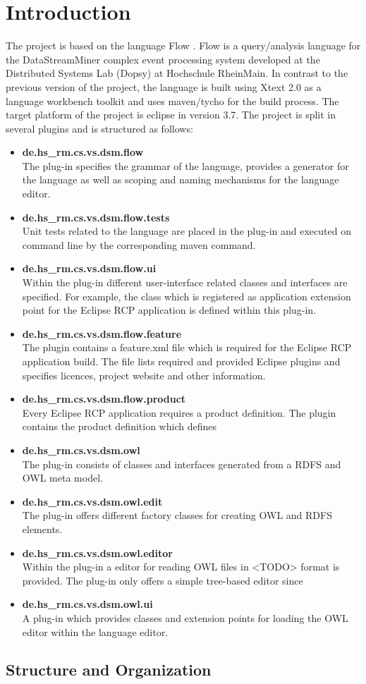 \section{Introduction}
The project is based on the language Flow \cite{297:Frey2010}. Flow is a 
query/analysis language for the DataStreamMiner complex event processing system 
developed at the Distributed Systems Lab (Dopsy) at Hochschule RheinMain. In contrast to 
the previous version of the project, the language is built using Xtext 2.0 as a
language workbench toolkit and uses maven/tycho for the build process. The 
target platform of the project is eclipse in version 3.7. The project is split 
in several plugins and is structured as follows:
\begin{itemize}
  \item \textbf{de.hs\_rm.cs.vs.dsm.flow} \\
  The plug-in specifies the grammar of the language, provides a generator for 
  the language as well as scoping and naming mechanisms for the language editor.
  \item \textbf{ de.hs\_rm.cs.vs.dsm.flow.tests} \\
  Unit tests related to the language are placed in the plug-in and executed on 
  command line by the corresponding maven command.
  \item \textbf{de.hs\_rm.cs.vs.dsm.flow.ui} \\
  Within the plug-in different user-interface related classes and interfaces are
  specified. For example, the class which is registered as application extension 
  point for the Eclipse RCP application is defined within this plug-in.
  \item \textbf{de.hs\_rm.cs.vs.dsm.flow.feature} \\
  The plugin contains a feature.xml file which is required for the Eclipse RCP 
  application build. The file lists required and provided Eclipse plugins and 
  specifies licences, project website and other information.
  \item \textbf{de.hs\_rm.cs.vs.dsm.flow.product} \\
  Every Eclipse RCP application requires a product definition. The plugin 
  contains the product definition which defines
  \item \textbf{de.hs\_rm.cs.vs.dsm.owl} \\
  The plug-in consists of classes and interfaces generated from a RDFS and OWL 
  meta model.
  \item \textbf{de.hs\_rm.cs.vs.dsm.owl.edit} \\
  The plug-in offers different factory classes for creating OWL and RDFS 
  elements.
  \item \textbf{de.hs\_rm.cs.vs.dsm.owl.editor} \\
  Within the plug-in a editor for reading OWL files in <TODO> format is 
  provided. The plug-in only offers a simple tree-based editor since
  \item \textbf{de.hs\_rm.cs.vs.dsm.owl.ui} \\
  A plug-in which provides classes and extension points for loading the OWL 
  editor within the language editor. 
\end{itemize}

\subsection{Structure and Organization}

